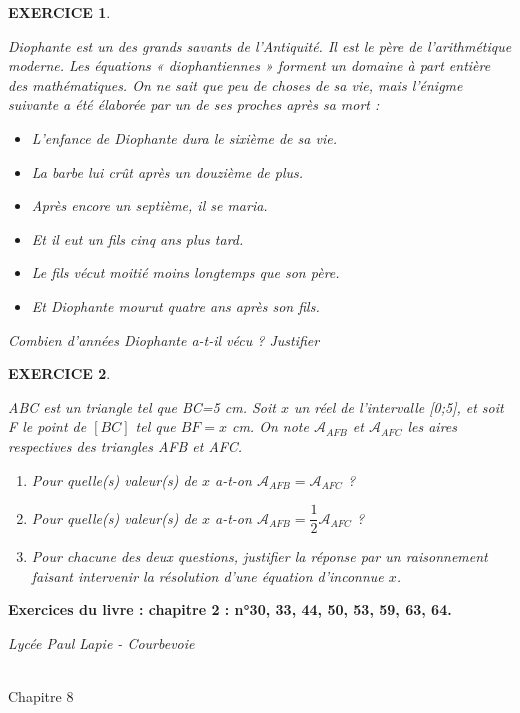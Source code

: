 \documentclass[a4paper]{article}   %
\renewcommand{\(}{\left(}
\renewcommand{\)}{\right)}
\newtheorem{EXO}{\large EXERCICE }
\newenvironment{EX}   { \setcounter{ques}{0} \begin{EXO} \hrulefill ~\vspace{0.3cm}

\normalfont}    {\end{EXO} \medskip}
\newcommand{\f}{\dfrac} 	%
\def\cl{{\Large \bf{2nde}}}
\begin{document}
\begin{EX}
Diophante est un des grands savants de l'Antiquité. Il est le père de l'arithmétique moderne. Les équations « diophantiennes » forment un domaine à part entière des mathématiques. On ne sait que peu de choses de sa vie, mais l'énigme suivante a été élaborée par un de ses proches après sa mort :
\begin{itemize}
\item L'enfance de Diophante dura le sixième de sa vie.
\item La barbe lui crût après un douzième de plus.
\item Après encore un septième, il se maria.
\item Et il eut un fils cinq ans plus tard.
\item Le fils vécut moitié moins longtemps que son père.
\item Et Diophante mourut quatre ans après son fils.\end{itemize}
Combien d’années Diophante a-t-il vécu ? Justifier
\end{EX}

\begin{EX}
ABC est un triangle tel que BC=5 cm.
Soit $x$ un réel de l'intervalle [0;5], et soit F le point de $[BC]$ tel que $BF=x$ cm.
On note  $\mathcal{A}_{AFB}$ et $\mathcal{A}_{AFC}$ les aires respectives des triangles AFB et AFC.

\begin{enumerate}
\item  Pour quelle(s) valeur(s) de $x$ a-t-on $\mathcal{A}_{AFB}=\mathcal{A}_{AFC}$ ?
\item Pour quelle(s) valeur(s) de $x$ a-t-on $\mathcal{A}_{AFB}=\f{1}{2}\mathcal{A}_{AFC}$ ? 
\item Pour chacune des deux questions, justifier la réponse par un raisonnement faisant intervenir la résolution d'une équation d'inconnue $x$.
\end{enumerate}

\end{EX}
{\bf{Exercices du livre : chapitre 2 : n°30, 33, 44, 50, 53, 59, 63, 64.}}





\newpage \setcounter{EXO}{0}



\noindent\begin{minipage}{.20\linewidth}\begin{center}                  
\noindent \emph{Lycée Paul Lapie - Courbevoie}
\end{center}\end{minipage}
\begin{minipage}{1.5\linewidth}\begin{center}	
\noindent \cl\\ Chapitre 8
\end{center}\end{minipage}
\end{document}
